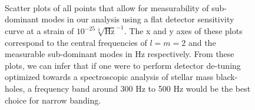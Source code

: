 \begin{figure}[h!]
\centering

\\
\centering
{}

\caption{\label{fig:freqInHz}Scatter plots of all points that allow for measurability of sub-dominant modes in our analysis using a flat detector sensitivity curve at a strain of $10^{-25}$$\sqrt[2]{\mathrm{Hz}}^{-1}$. The x and y axes of these plots correspond to the central frequencies of $l=m=2$ and the measurable sub-dominant modes in Hz respectively. From these plots, we can infer that if one were to perform detector de-tuning optimized towards a spectroscopic analysis of stellar mass black-holes, a frequency band around 300 Hz to 500 Hz would be the best choice for narrow banding.}
\end{figure}



